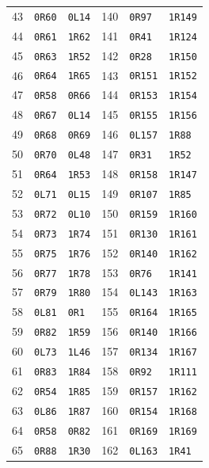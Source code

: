 {\begin{longtable}{@{}rll@{\qquad\quad}rll@{}}
43 & \texttt{0R60} & \texttt{0L14} & 140 & \texttt{0R97} & \texttt{1R149}\\
44 & \texttt{0R61} & \texttt{1R62} & 141 & \texttt{0R41} & \texttt{1R124}\\
45 & \texttt{0R63} & \texttt{1R52} & 142 & \texttt{0R28} & \texttt{1R150}\\
46 & \texttt{0R64} & \texttt{1R65} & 143 & \texttt{0R151} & \texttt{1R152}\\
47 & \texttt{0R58} & \texttt{0R66} & 144 & \texttt{0R153} & \texttt{1R154}\\
48 & \texttt{0R67} & \texttt{0L14} & 145 & \texttt{0R155} & \texttt{1R156}\\
49 & \texttt{0R68} & \texttt{0R69} & 146 & \texttt{0L157} & \texttt{1R88}\\
50 & \texttt{0R70} & \texttt{0L48} & 147 & \texttt{0R31} & \texttt{1R52}\\
51 & \texttt{0R64} & \texttt{1R53} & 148 & \texttt{0R158} & \texttt{1R147}\\
52 & \texttt{0L71} & \texttt{0L15} & 149 & \texttt{0R107} & \texttt{1R85}\\
53 & \texttt{0R72} & \texttt{0L10} & 150 & \texttt{0R159} & \texttt{1R160}\\
54 & \texttt{0R73} & \texttt{1R74} & 151 & \texttt{0R130} & \texttt{1R161}\\
55 & \texttt{0R75} & \texttt{1R76} & 152 & \texttt{0R140} & \texttt{1R162}\\
56 & \texttt{0R77} & \texttt{1R78} & 153 & \texttt{0R76} & \texttt{1R141}\\
57 & \texttt{0R79} & \texttt{1R80} & 154 & \texttt{0L143} & \texttt{1R163}\\
58 & \texttt{0L81} & \texttt{0R1} & 155 & \texttt{0R164} & \texttt{1R165}\\
59 & \texttt{0R82} & \texttt{1R59} & 156 & \texttt{0R140} & \texttt{1R166}\\
60 & \texttt{0L73} & \texttt{1L46} & 157 & \texttt{0R134} & \texttt{1R167}\\
61 & \texttt{0R83} & \texttt{1R84} & 158 & \texttt{0R92} & \texttt{1R111}\\
62 & \texttt{0R54} & \texttt{1R85} & 159 & \texttt{0R157} & \texttt{1R162}\\
63 & \texttt{0L86} & \texttt{1R87} & 160 & \texttt{0R154} & \texttt{1R168}\\
64 & \texttt{0R58} & \texttt{0R82} & 161 & \texttt{0R169} & \texttt{1R169}\\
65 & \texttt{0R88} & \texttt{1R30} & 162 & \texttt{0L163} & \texttt{1R41}\\

\end{longtable}}
